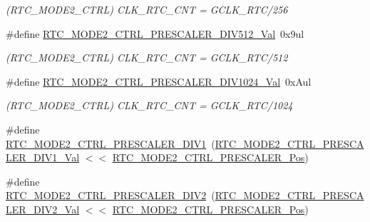 \begin{DoxyCompactItemize}
\begin{DoxyCompactList}\small\item\em (R\+T\+C\+\_\+\+M\+O\+D\+E2\+\_\+\+C\+T\+RL) C\+L\+K\+\_\+\+R\+T\+C\+\_\+\+C\+NT = G\+C\+L\+K\+\_\+\+R\+T\+C/256 \end{DoxyCompactList}\item 
\#define \mbox{\hyperlink{group___s_a_m_d21___r_t_c_gaa38f16b6e6918d9161ec7ed48ec2e02c}{R\+T\+C\+\_\+\+M\+O\+D\+E2\+\_\+\+C\+T\+R\+L\+\_\+\+P\+R\+E\+S\+C\+A\+L\+E\+R\+\_\+\+D\+I\+V512\+\_\+\+Val}}~0x9ul
\begin{DoxyCompactList}\small\item\em (R\+T\+C\+\_\+\+M\+O\+D\+E2\+\_\+\+C\+T\+RL) C\+L\+K\+\_\+\+R\+T\+C\+\_\+\+C\+NT = G\+C\+L\+K\+\_\+\+R\+T\+C/512 \end{DoxyCompactList}\item 
\#define \mbox{\hyperlink{group___s_a_m_d21___r_t_c_gac3c649a17480eeaef7097cd641d6d9d7}{R\+T\+C\+\_\+\+M\+O\+D\+E2\+\_\+\+C\+T\+R\+L\+\_\+\+P\+R\+E\+S\+C\+A\+L\+E\+R\+\_\+\+D\+I\+V1024\+\_\+\+Val}}~0x\+Aul
\begin{DoxyCompactList}\small\item\em (R\+T\+C\+\_\+\+M\+O\+D\+E2\+\_\+\+C\+T\+RL) C\+L\+K\+\_\+\+R\+T\+C\+\_\+\+C\+NT = G\+C\+L\+K\+\_\+\+R\+T\+C/1024 \end{DoxyCompactList}\item 
\#define \mbox{\hyperlink{group___s_a_m_d21___r_t_c_gadf73656ec44d678b4dd34d1d49dd5f76}{R\+T\+C\+\_\+\+M\+O\+D\+E2\+\_\+\+C\+T\+R\+L\+\_\+\+P\+R\+E\+S\+C\+A\+L\+E\+R\+\_\+\+D\+I\+V1}}~(\mbox{\hyperlink{group___s_a_m_d21___r_t_c_ga8bcb27a42c2264c342c2516e9b00e121}{R\+T\+C\+\_\+\+M\+O\+D\+E2\+\_\+\+C\+T\+R\+L\+\_\+\+P\+R\+E\+S\+C\+A\+L\+E\+R\+\_\+\+D\+I\+V1\+\_\+\+Val}} $<$$<$ \mbox{\hyperlink{group___s_a_m_d21___r_t_c_gab49acaac9629f089845263f149b8a6c0}{R\+T\+C\+\_\+\+M\+O\+D\+E2\+\_\+\+C\+T\+R\+L\+\_\+\+P\+R\+E\+S\+C\+A\+L\+E\+R\+\_\+\+Pos}})
\item 
\#define \mbox{\hyperlink{group___s_a_m_d21___r_t_c_gafd5560be54618d4f58f5b7d09a0bffe6}{R\+T\+C\+\_\+\+M\+O\+D\+E2\+\_\+\+C\+T\+R\+L\+\_\+\+P\+R\+E\+S\+C\+A\+L\+E\+R\+\_\+\+D\+I\+V2}}~(\mbox{\hyperlink{group___s_a_m_d21___r_t_c_ga81400ad86b59d26d3ee9842a8d2c4a51}{R\+T\+C\+\_\+\+M\+O\+D\+E2\+\_\+\+C\+T\+R\+L\+\_\+\+P\+R\+E\+S\+C\+A\+L\+E\+R\+\_\+\+D\+I\+V2\+\_\+\+Val}} $<$$<$ \mbox{\hyperlink{group___s_a_m_d21___r_t_c_gab49acaac9629f089845263f149b8a6c0}{R\+T\+C\+\_\+\+M\+O\+D\+E2\+\_\+\+C\+T\+R\+L\+\_\+\+P\+R\+E\+S\+C\+A\+L\+E\+R\+\_\+\+Pos}})
\item 

\end{DoxyCompactItemize}
